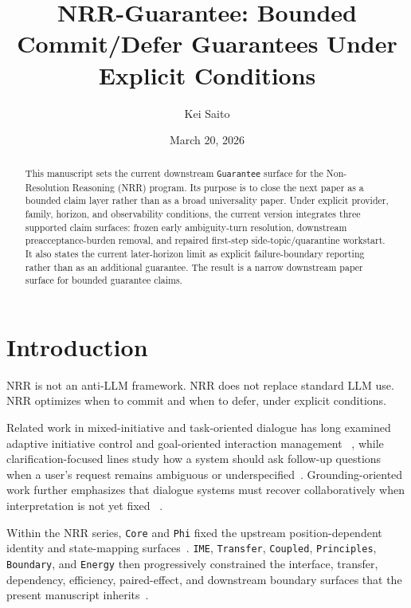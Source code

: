 \documentclass[11pt]{article}
\title{NRR-Guarantee: Bounded Commit/Defer Guarantees Under Explicit Conditions}
\author{Kei Saito}
\date{March 20, 2026}
\begin{document}
\maketitle

\begin{abstract}
This manuscript sets the current downstream \texttt{Guarantee} surface for the
Non-Resolution Reasoning (NRR) program. Its purpose is to close the next paper
as a bounded claim layer rather than as a broad universality paper. Under
explicit provider, family, horizon, and observability conditions, the current
version integrates three supported claim surfaces: frozen early ambiguity-turn
resolution, downstream preacceptance-burden removal, and repaired first-step
side-topic/quarantine workstart. It also states the current later-horizon limit
as explicit failure-boundary reporting rather than as an additional guarantee.
The result is a narrow downstream paper surface for bounded guarantee claims.
\end{abstract}

\section{Introduction}

NRR is not an anti-LLM framework. NRR does not replace standard LLM use. NRR
optimizes when to commit and when to defer, under explicit conditions.

Related work in mixed-initiative and task-oriented dialogue has long examined
adaptive initiative control and goal-oriented interaction management
~\cite{saito2000mimic,saito2017taskdialogue}, while clarification-focused lines
study how a system should ask follow-up questions when a user's request remains
ambiguous or underspecified~\cite{saito2003clarification,saito2018evpi,saito2020interactive}. Grounding-oriented work further emphasizes that dialogue systems
must recover collaboratively when interpretation is not yet fixed
~\cite{saito2021groundedclarifications,saito2021grounding}.

Within the NRR series, \texttt{Core} and \texttt{Phi} fixed the upstream
position-dependent identity and state-mapping surfaces~\cite{saito2025nrr,saito2026phi}.
\texttt{IME}, \texttt{Transfer}, \texttt{Coupled}, \texttt{Principles},
\texttt{Boundary}, and \texttt{Energy} then progressively constrained the
interface, transfer, dependency, efficiency, paired-effect, and downstream
boundary surfaces that the present manuscript inherits~\cite{saito2026ime,saito2026transfer,saito2026coupled,saito2026principles,saito2026boundary,saito2026energy}.
\end{document}
